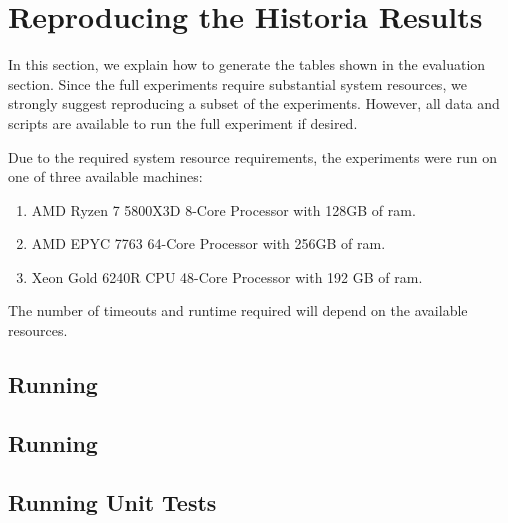 \documentclass{acmart} %
\newcommand{\inputsection}[1]{\ifthenelse{\boolean{#1}}{}{\TODO{====== temp exclusion section #1 for build =======}}}
\begin{document}
\section{Reproducing the Historia Results}

In this section, we explain how to generate the tables shown in the evaluation section.
Since the full experiments require substantial system resources, we strongly suggest reproducing a subset of the experiments.  However, all data and scripts are available to run the full experiment if desired.

Due to the required system resource requirements, the experiments were run on one of three available machines:
\begin{enumerate}
    \item AMD Ryzen 7 5800X3D 8-Core Processor with 128GB of ram.
    \item AMD EPYC 7763 64-Core Processor with 256GB of ram.
    \item Xeon Gold 6240R CPU 48-Core Processor with 192 GB of ram.
\end{enumerate}
The number of timeouts and runtime required will depend on the available resources.


\subsection{Running }

\TODO{}

\subsection{Running }

\TODO{}

\subsection{Running Unit Tests}

\TODO{}





\end{document}
